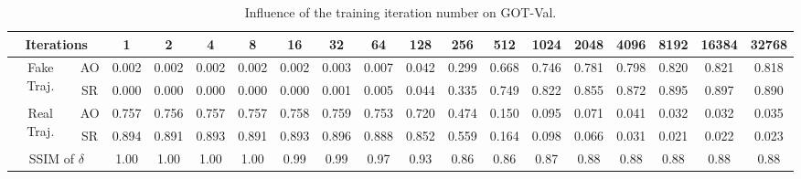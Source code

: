 \documentclass[journal]{IEEEtran}
\begin{document}
\begin{table}
\centering
\footnotesize
\tabcolsep=3.0pt
\caption{Influence of the training iteration number on GOT-Val.}
\begin{tabular}{cc|cccccccccccccccc} 
\toprule
\multicolumn{2}{c|}{Iterations}     & 1     & 2     & 4     & 8     & 16    & 32    & 64    & 128   & 256   & 512   & 1024  & 2048  & 4096  & 8192  & 16384 & 32768  \\ 
\midrule
\multirow{2}{*}{Fake Traj.} & AO    & 0.002 & 0.002 & 0.002 & 0.002 & 0.002 & 0.003 & 0.007 & 0.042 & 0.299 & 0.668 & 0.746 & 0.781 & 0.798 & 0.820 & 0.821 & 0.818  \\
                                 & SR    & 0.000 & 0.000 & 0.000 & 0.000 & 0.000 & 0.001 & 0.005 & 0.044 & 0.335 & 0.749 & 0.822 & 0.855 & 0.872 & 0.895 & 0.897 & 0.890  \\ 
\midrule
\multirow{2}{*}{Real Traj.} & AO    & 0.757 & 0.756 & 0.757 & 0.757 & 0.758 & 0.759 & 0.753 & 0.720 & 0.474 & 0.150 & 0.095 & 0.071 & 0.041 & 0.032 & 0.032 & 0.035  \\
                                 & SR    & 0.894 & 0.891 & 0.893 & 0.891 & 0.893 & 0.896 & 0.888 & 0.852 & 0.559 & 0.164 & 0.098 & 0.066 & 0.031 & 0.021 & 0.022 & 0.023  \\ 
\midrule
\multicolumn{2}{c|}{SSIM of $\delta$}                        & 1.00  & 1.00  & 1.00  & 1.00  & 0.99  & 0.99  & 0.97  & 0.93  & 0.86  & 0.86  & 0.87  & 0.88  & 0.88  & 0.88  & 0.88  & 0.88   \\
\bottomrule
\end{tabular}
\label{tab:iter}
\end{table}
\end{document}

